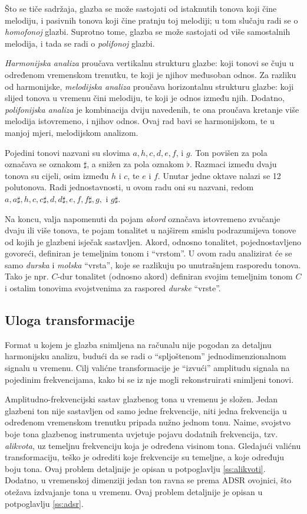 \documentclass[a4paper, 10pt, twocolumn]{article}
\begin{document}
Što se tiče sadržaja, glazba se može sastojati od istaknutih tonova koji čine melodiju, i pasivnih tonova koji čine pratnju toj melodiji; u tom slučaju radi se o \textit{homofonoj} glazbi.
Suprotno tome, glazba se može sastojati od više samostalnih melodija, i tada se radi o \textit{polifonoj} glazbi.

\textit{Harmonijska analiza} proučava vertikalnu strukturu glazbe: koji tonovi se čuju u određenom vremenskom trenutku, te koji je njihov međusoban odnos.
Za razliku od harmonijske, \textit{melodijska analiza} proučava horizontalnu strukturu glazbe: koji slijed tonova u vremenu čini melodiju, te koji je odnos između njih.
Dodatno, \textit{polifonijska analiza} je kombinacija dviju navedenih, te ona proučava kretanje više melodija istovremeno, i njihov odnos.
Ovaj rad bavi se harmonijskom, te u manjoj mjeri, melodijskom analizom.

Pojedini tonovi nazvani su slovima $a, h, c, d, e, f$, i $g$.
Ton povišen za pola označava se oznakom $\sharp$, a snižen za pola  oznakom $\flat$.
Razmaci između dvaju tonova su cijeli, osim između $h$ i $c$, te $e$ i $f$.
Unutar jedne oktave nalazi se 12 polutonova.
Radi jednostavnosti, u ovom radu oni su nazvani, redom $a, a\sharp, h, c, c\sharp, d, d\sharp, e, f, f\sharp, g,$ i $g\sharp$.

Na koncu, valja napomenuti da pojam \textit{akord} označava istovremeno zvučanje dvaju ili više tonova, te pojam tonalitet u najširem smislu podrazumijeva tonove od kojih je glazbeni isječak sastavljen.
Akord, odnosno tonalitet, pojednostavljeno govoreći, definiran je temeljnim tonom i ``vrstom''.
U ovom radu analizirat će se samo \textit{durska} i \textit{molska} ``vrsta'', koje se razlikuju po unutrašnjem rasporedu tonova.
Tako je npr. $C$-dur tonalitet (odnosno akord) definiran svojim temeljnim tonom $C$ i ostalim tonovima svojstvenima za raspored \textit{durske} ``vrste''\cite{osnove}.

\subsection{Uloga transformacije}
Format u kojem je glazba snimljena na računalu nije pogodan za detaljnu harmonijsku analizu, budući da se radi o ``spljoštenom'' jednodimenzionalnom signalu u vremenu.
Cilj valićne transformacije je ``izvući'' amplitudu signala na pojedinim frekvencijama, kako bi se iz nje mogli rekonstruirati snimljeni tonovi.

Amplitudno-frekvencijski sastav glazbenog tona u vremenu je složen.
Jedan glazbeni ton nije sastavljen od samo jedne frekvencije, niti jedna frekvencija u određenom vremenskom trenutku pripada nužno jednom tonu.
Naime, svojstvo boje tona glazbenog instrumenta uvjetuje pojavu dodatnih frekvencija, tzv. \textit{alikvota}, uz temeljnu frekvenciju koja je određena visinom tona.
Gledajući valićnu transformaciju, teško je odrediti koje frekvencije su temeljne, a koje određuju boju tona.
Ovaj problem detaljnije je opisan u potpoglavlju \ref{ss:alikvoti}.
Dodatno, u vremenskoj dimenziji jedan ton ravna se prema ADSR ovojnici, što otežava izdvajanje tona u vremenu.
Ovaj problem detaljnije je opisan u potpoglavlju \ref{ss:adsr}.
\end{document}
